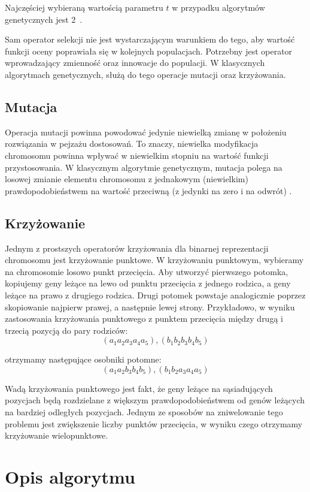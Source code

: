 \documentclass{xmgr}
\begin{document}
Najczęściej wybieraną wartością parametru $t$ w przypadku algorytmów genetycznych jest 2~\cite{Luke2009Metaheuristics}.

Sam operator selekcji nie jest wystarczającym warunkiem do tego, aby wartość funkcji oceny poprawiała się w kolejnych populacjach. Potrzebny jest operator wprowadzający zmienność oraz innowacje do populacji. W klasycznych algorytmach genetycznych, służą do tego operacje mutacji oraz krzyżowania.

\section{Mutacja}

Operacja mutacji powinna powodować jedynie niewielką zmianę w położeniu rozwiązania w pejzażu dostosowań. To znaczy, niewielka modyfikacja chromosomu powinna wpływać w niewielkim stopniu na wartość funkcji przystosowania. W klasycznym algorytmie genetycznym, mutacja polega na losowej zmianie elementu chromosomu z jednakowym (niewielkim) prawdopodobieństwem na wartość przeciwną (z jedynki na zero i na odwrót) \cite{Goldberg:1998:AGZ}.

\section{Krzyżowanie}

Jednym z prostszych operatorów krzyżowania dla binarnej reprezentacji chromosomu jest krzyżowanie punktowe. W krzyżowaniu punktowym, wybieramy na chromosomie losowo punkt przecięcia. Aby utworzyć pierwszego potomka, kopiujemy geny leżące na lewo od punktu przecięcia z jednego rodzica, a geny leżące na prawo z drugiego rodzica. Drugi potomek powstaje analogicznie poprzez skopiowanie najpierw prawej, a następnie lewej strony. Przykładowo, w wyniku zastosowania krzyżowania punktowego z punktem przecięcia między drugą i trzecią pozycją do pary rodziców:
$$(a_1 a_2 a_3 a_4 a_5), (b_1 b_2 b_3 b_4 b_5)$$

otrzymamy następujące osobniki potomne:
$$(a_1 a_2 b_3 b_4 b_5), (b_1 b_2 a_3 a_4 a_5)$$

Wadą krzyżowania punktowego jest fakt, że geny leżące na sąsiadujących pozycjach będą rozdzielane z większym prawdopodobieństwem od genów leżących na bardziej odległych pozycjach. Jednym ze sposobów na zniwelowanie tego problemu jest zwiększenie liczby punktów przecięcia, w wyniku czego otrzymamy krzyżowanie wielopunktowe.


\chapter{Opis algorytmu}
\end{document}
